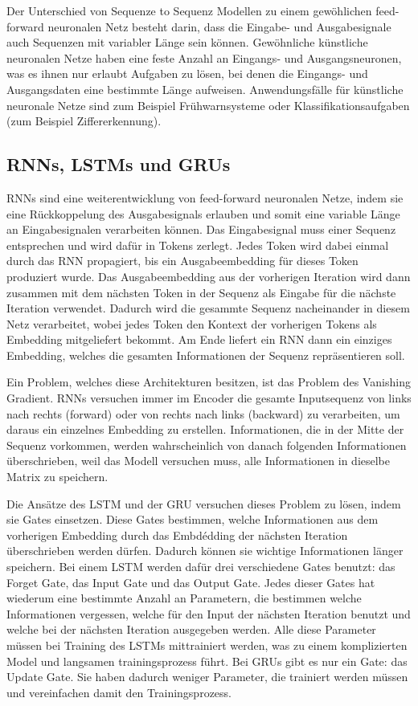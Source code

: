 Der Unterschied von Sequenze to Sequenz Modellen zu einem gewöhlichen feed-forward neuronalen Netz besteht darin, dass die Eingabe- und Ausgabesignale auch Sequenzen mit variabler Länge sein können.
Gewöhnliche künstliche neuronalen Netze haben eine feste Anzahl an Eingangs- und Ausgangsneuronen, was es ihnen nur erlaubt Aufgaben zu lösen, bei denen die Eingangs- und Ausgangsdaten eine bestimmte Länge aufweisen.
Anwendungsfälle für künstliche neuronale Netze sind zum Beispiel Frühwarnsysteme oder Klassifikationsaufgaben (zum Beispiel Ziffererkennung).

\subsection{RNNs, LSTMs und GRUs}

RNNs sind eine weiterentwicklung von feed-forward neuronalen Netze, indem sie eine Rückkoppelung des Ausgabesignals erlauben und somit eine variable Länge an Eingabesignalen verarbeiten können.
Das Eingabesignal muss einer Sequenz entsprechen und wird dafür in Tokens zerlegt.
Jedes Token wird dabei einmal durch das RNN propagiert, bis ein Ausgabeembedding für dieses Token produziert wurde.
Das Ausgabeembedding aus der vorherigen Iteration wird dann zusammen mit dem nächsten Token in der Sequenz als Eingabe für die nächste Iteration verwendet.
Dadurch wird die gesammte Sequenz nacheinander in diesem Netz verarbeitet, wobei jedes Token den Kontext der vorherigen Tokens als Embedding mitgeliefert bekommt.
Am Ende liefert ein RNN dann ein einziges Embedding, welches die gesamten Informationen der Sequenz repräsentieren soll.

Ein Problem, welches diese Architekturen besitzen, ist das Problem des Vanishing Gradient.
RNNs versuchen immer im Encoder die gesamte Inputsequenz von links nach rechts (forward) oder von rechts nach links (backward) zu verarbeiten, um daraus ein einzelnes Embedding zu erstellen.
Informationen, die in der Mitte der Sequenz vorkommen, werden wahrscheinlich von danach folgenden Informationen überschrieben, weil das Modell versuchen muss, alle Informationen in dieselbe Matrix zu speichern. 

Die Ansätze des LSTM und der GRU versuchen dieses Problem zu lösen, indem sie Gates einsetzen.
Diese Gates bestimmen, welche Informationen aus dem vorherigen Embedding durch das Embdédding der nächsten Iteration überschrieben werden dürfen.
Dadurch können sie wichtige Informationen länger speichern.
Bei einem LSTM werden dafür drei verschiedene Gates benutzt: das Forget Gate, das Input Gate und das Output Gate.
Jedes dieser Gates hat wiederum eine bestimmte Anzahl an Parametern, die bestimmen welche Informationen vergessen, welche für den Input der nächsten Iteration benutzt und welche bei der nächsten Iteration ausgegeben werden.
Alle diese Parameter müssen bei Training des LSTMs mittrainiert werden, was zu einem komplizierten Model und langsamen trainingsprozess führt.
Bei GRUs gibt es nur ein Gate: das Update Gate.
Sie haben dadurch weniger Parameter, die trainiert werden müssen und vereinfachen damit den Trainingsprozess.
\cite{pirani2022}

